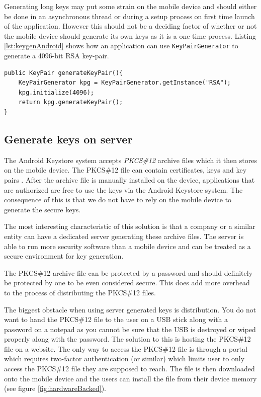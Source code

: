 Generating long keys may put some strain on the mobile device and should either be done in an asynchronous thread or during a setup process on first time launch of the application. However this should not be a deciding factor of whether or not the mobile device should generate its own keys as it is a one time process. Listing \ref{lst:keygenAndroid} shows how an application can use \texttt{KeyPairGenerator} to generate a 4096-bit RSA key-pair.

\begin{lstlisting}[caption=Generating RSA key-pair on Android device using KeyPairGenerator, label=lst:keygenAndroid,escapechar=å]
public KeyPair generateKeyPair(){
    KeyPairGenerator kpg = KeyPairGenerator.getInstance("RSA");
    kpg.initialize(4096);
    return kpg.generateKeyPair();
}
\end{lstlisting}

\subsection{Generate keys on server}
\label{sec:generateKeysOnServer}
The Android Keystore system accepts \textit{PKCS\#12} archive files which it then stores on the mobile device. The PKCS\#12 file can contain certificates, keys and key pairs \cite{pkcs12}. After the archive file is manually installed on the device, applications that are authorized are free to use the keys via the Android Keystore system. The consequence of this is that we do not have to rely on the mobile device to generate the secure keys.

The most interesting characteristic of this solution is that a company or a similar entity can have a dedicated server generating these archive files. The server is able to run more security software than a mobile device and can be treated as a secure environment for key generation.

The PKCS\#12 archive file can be protected by a password and should definitely be protected by one to be even considered secure. This does add more overhead to the process of distributing the PKCS\#12 files.

The biggest obstacle when using server generated keys is distribution. You do not want to hand the PKCS\#12 file to the user on a USB stick along with a password on a notepad as you cannot be sure that the USB is destroyed or wiped properly along with the password. The solution to this is hosting the PKCS\#12 file on a website. The only way to access the PKCS\#12 file is through a portal which requires two-factor authentication (or similar) which limits user to only access the PKCS\#12 file they are supposed to reach. The file is then downloaded onto the mobile device and the users can install the file from their device memory (see figure \ref{fig:hardwareBacked}).


